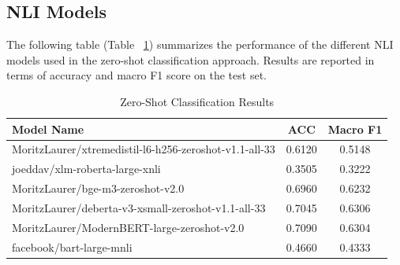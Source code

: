 \documentclass[runningheads]{llncs}
\begin{document}
\vspace{-1em}
\subsection{NLI Models}
\vspace{-1em}
The following table (Table ~\ref{tab:zero_shot_results}) summarizes the performance of the different NLI models used in the zero-shot classification approach. Results are reported in terms of accuracy and macro F1 score on the test set.

\begin{table}[H]
\centering
\caption{Zero-Shot Classification Results}
\label{tab:zero_shot_results}
\begin{tabular}{lcc}
\hline
\textbf{Model Name} & \textbf{ACC} & \textbf{Macro F1} \\
\hline
MoritzLaurer/xtremedistil-l6-h256-zeroshot-v1.1-all-33 & 0.6120 & 0.5148 \\
joeddav/xlm-roberta-large-xnli & 0.3505 & 0.3222 \\
MoritzLaurer/bge-m3-zeroshot-v2.0 & 0.6960 & 0.6232 \\
MoritzLaurer/deberta-v3-xsmall-zeroshot-v1.1-all-33 & 0.7045 & 0.6306 \\
MoritzLaurer/ModernBERT-large-zeroshot-v2.0 & 0.7090 & 0.6304 \\
facebook/bart-large-mnli & 0.4660 & 0.4333 \\
\hline
\end{tabular}
\end{table}
\end{document}
